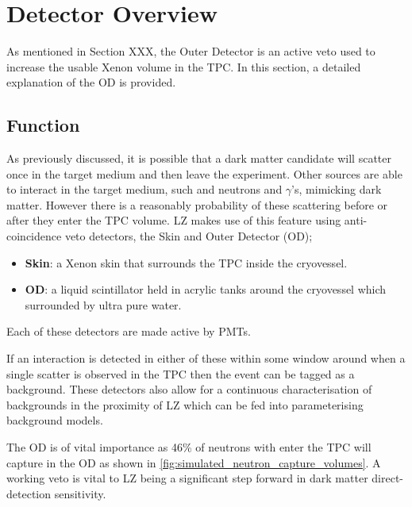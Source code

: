 \section{Detector Overview} \label{OD_detector_overview}
\par
As mentioned in Section XXX, the Outer Detector is an active veto used to increase the usable Xenon volume in the TPC.
In this section, a detailed explanation of the OD is provided.

\subsection{Function}
\par
As previously discussed, it is possible that a dark matter candidate will scatter once in the target medium and then leave the experiment.
Other sources are able to interact in the target medium, such and neutrons and $\gamma$'s, mimicking dark matter.
However there is a reasonably probability of these scattering before or after they enter the TPC volume.
LZ makes use of this feature using anti-coincidence veto detectors, the Skin and Outer Detector (OD);
\begin{itemize}
    \item \textbf{Skin}: a Xenon skin that surrounds the TPC inside the cryovessel.
    \item \textbf{OD}: a liquid scintillator held in acrylic tanks around the cryovessel which surrounded by ultra pure water.
\end{itemize}
Each of these detectors are made active by PMTs.
\par
If an interaction is detected in either of these within some window around when a single scatter is observed in the TPC then the event can be tagged as a background.
These detectors also allow for a continuous characterisation of backgrounds in the proximity of LZ which can be fed into parameterising background models.


\par
The OD is of vital importance as 46\% of neutrons with enter the TPC will capture in the OD as shown in \autoref{fig:simulated_neutron_capture_volumes}.
A working veto is vital to LZ being a significant step forward in dark matter direct-detection sensitivity.



